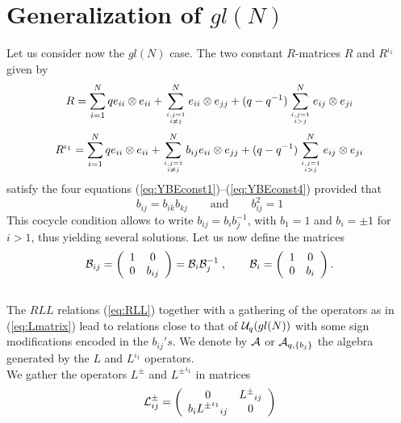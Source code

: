 \documentclass[a4paper,a4paper]{article}
\def\cA{{\cal A}}          \def\cB{{\cal B}}          \def\cC{{\cal C}}
\begin{document}
\section{Generalization of $gl(N)$}
\setcounter{equation}{0}

\indent

Let us consider now the $gl(N)$ case.
The two constant $R$-matrices $R$ and $R^{\iota_1}$ given by 
\begin{equation}
  \label{eq:Rsln}
  R = \sum_{i=1}^{N} q e_{ii} \otimes e_{ii}
  + \sum_{i,j=1 \atop i\neq j}^{N}  e_{ii} \otimes e_{jj}
  + (q-q^{-1}) \sum_{i,j=1 \atop i>j}^{N} e_{ij} \otimes e_{ji}
\end{equation}
\begin{equation}
  \label{eq:Rslniota1}
  R^{\iota_1} = \sum_{i=1}^{N} q e_{ii} \otimes e_{ii}
  + \sum_{i,j=1 \atop i\neq j}^{N} b_{ij} e_{ii} \otimes e_{jj}
  + (q-q^{-1}) \sum_{i,j=1 \atop i>j}^{N} e_{ij} \otimes e_{ji}
\end{equation}
satisfy the four equations (\ref{eq:YBEconst1})--(\ref{eq:YBEconst4})
provided that  
\begin{equation}
  \label{eq:bij}
  b_{ij} = b_{ik} b_{kj} \qquad \mbox{and} \qquad b_{ij}^2=1
\end{equation}
This cocycle condition allows to write $b_{ij}=b_i b_j^{-1}$, with
$b_1=1$ and $b_i=\pm 1$ for $i>1$, thus yielding several
solutions. Let us now define the matrices 
\begin{equation}
  \label{eq:Bij}
  \cB_{ij} = \left(
    \begin{array}{cc}
      1 & 0 \\
      0 & b_{ij}
    \end{array}
  \right)
  = \cB_i \cB_j^{-1}\;,
  \qquad
  \cB_i = \left(
    \begin{array}{cc}
      1 & 0 \\
      0 & b_{i}
    \end{array}
  \right).
\end{equation}
\\
The $RLL$ relations (\ref{eq:RLL}) together with a gathering of the
operators as in (\ref{eq:Lmatrix}) 
lead to relations close to that of ${\cal U}_q(gl(N))$ with some sign
modifications encoded in the $b_{ij}'s$. We denote by $\cA$ or 
$\cA_{q,\{b_j\}}$ the algebra generated by the $L$ and $L^{\iota_1}$ 
operators.
\\
We gather the operators $L^\pm$ and ${L^\pm}^{\iota_1}$ in matrices
\begin{equation}
  \label{eq:Lij}
  {\cal L}^\pm_{ij} = \left(
    \begin{array}{cc}
      0 & {L^\pm}_{ij} \\
      b_i {{L^\pm}^{\iota_1}}_{ij} & 0
    \end{array}
  \right)
\end{equation}
\end{document}
